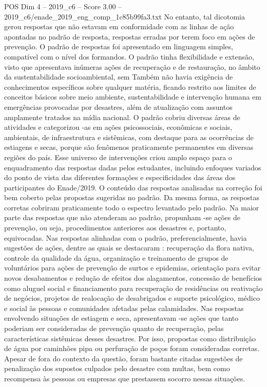 \begin{textsample}{POS Dim 4 – 2019\_c6 – Score 3.00 – 2019\_c6/enade\_2019\_eng\_comp\_1c85b99fa3.txt}
No entanto, tal dicotomia gerou respostas que não estavam em conformidade com as linhas de ação apontadas no padrão de resposta, respostas erradas por terem foco em ações de prevenção.
O padrão de respostas foi apresentado em linguagem simples, compatível com o nível dos formandos.
O padrão tinha flexibilidade e extensão, visto que apresentava inúmeras ações de recuperação e de restauração, no âmbito da sustentabilidade socioambiental, sem Também não havia exigência de conhecimentos específicos sobre qualquer matéria, ficando restrito aos limites de conceitos básicos sobre meio ambiente, sustentabilidade e intervenção humana em emergências provocadas por desastres, além de atualização com assuntos amplamente tratados na mídia nacional.
O padrão cobriu diversas áreas de atividades e categorizou -as em ações psicossociais, econômicas e sociais, ambientais, de infraestrutura e sistêmicas, com destaque para as ocorrências de estiagens e secas, porque são fenômenos praticamente permanentes em diversas regiões do país.
Esse universo de intervenções criou amplo espaço para o enquadramento das respostas dadas pelos estudantes, incluindo enfoques variados do ponto de vista das diferentes formações e especificidades das áreas dos participantes do Enade/2019.
O conteúdo das respostas analisadas na correção foi bem coberto pelas propostas sugeridas no padrão.
Da mesma forma, as respostas corretas cobriram praticamente todo o espectro levantado pelo padrão.
Na maior parte das respostas que não atenderam ao padrão, propunham -se ações de prevenção, ou seja, procedimentos anteriores aos desastres e, portanto, equivocadas.
Nas respostas alinhadas com o padrão, preferencialmente, havia sugestões de ações, dentre as quais se destacaram : recuperação da flora nativa, controle da qualidade da água, organização e treinamento de grupos de voluntários para ações de prevenção de surtos e epidemias, orientação para evitar novos desabamentos e redução de efeitos dos alagamentos, concessão de benefícios como aluguel social e financiamento para recuperação de residências ou reativação de negócios, projetos de realocação de desabrigados e suporte psicológico, médico e social às pessoas e comunidades afetadas pelas calamidades.
Nas respostas envolvendo situações de estiagem e seca, apresentavam -se ações que tanto poderiam ser consideradas de prevenção quanto de recuperação, pelas características sistêmicas desses desastres.
Por isso, propostas como distribuição de água por caminhões pipa ou perfuração de poços foram consideradas corretas.
Apesar de fora do contexto da questão, foram bastante citadas sugestões de penalização dos supostos culpados pelo desastre com multas, bem como recompensa às pessoas ou empresas que prestassem socorro nessas situações.

\end{textsample}
